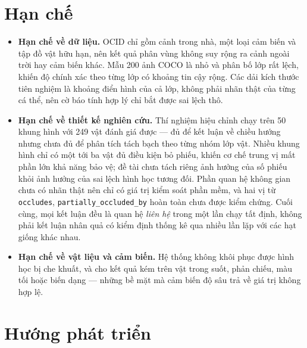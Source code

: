 \section{Hạn chế}

\begin{itemize}[leftmargin=1.5cm]
\item \textbf{Hạn chế về dữ liệu.} OCID chỉ gồm cảnh trong nhà, một loại cảm biến và tập đồ vật
hữu hạn, nên kết quả phân vùng không suy rộng ra cảnh ngoài trời hay cảm biến khác. Mẫu 200 ảnh
COCO là nhỏ và phân bố lớp rất lệch, khiến độ chính xác theo từng lớp có khoảng tin cậy rộng.
Các dải kích thước tiên nghiệm là khoảng điển hình của cả lớp, không phải nhãn thật của từng cá
thể, nên cờ báo tính hợp lý chỉ bắt được sai lệch thô.

\item \textbf{Hạn chế về thiết kế nghiên cứu.} Thí nghiệm hiệu chỉnh chạy trên 50 khung hình với
249 vật đánh giá được --- đủ để kết luận về chiều hướng nhưng chưa đủ để phân tích tách bạch
theo từng nhóm lớp vật. Nhiều khung hình chỉ có một tới ba vật đủ điều kiện bỏ phiếu, khiến cơ
chế trung vị mất phần lớn khả năng bảo vệ; đề tài chưa tách riêng ảnh hưởng của số phiếu khỏi
ảnh hưởng của sai lệch hình học tương đối. Phần quan hệ không gian chưa có nhãn thật nên chỉ có
giá trị kiểm soát phần mềm, và hai vị từ \texttt{occludes}, \texttt{partially\_occluded\_by}
hoàn toàn chưa được kiểm chứng. Cuối cùng, mọi kết luận đều là quan hệ \emph{liên hệ} trong một
lần chạy tất định, không phải kết luận nhân quả có kiểm định thống kê qua nhiều lần lặp với các
hạt giống khác nhau.

\item \textbf{Hạn chế về vật liệu và cảm biến.} Hệ thống không khôi phục được hình học bị che
khuất, và cho kết quả kém trên vật trong suốt, phản chiếu, màu tối hoặc biến dạng --- những bề
mặt mà cảm biến độ sâu trả về giá trị không hợp lệ.
\end{itemize}

\section{Hướng phát triển}

